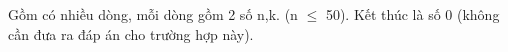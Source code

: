 Gồm có nhiều dòng, mỗi dòng gồm 2 số n,k. (n $\le$ 50). Kết thúc là số 0 (không cần đưa ra đáp án cho trường hợp này).  

\